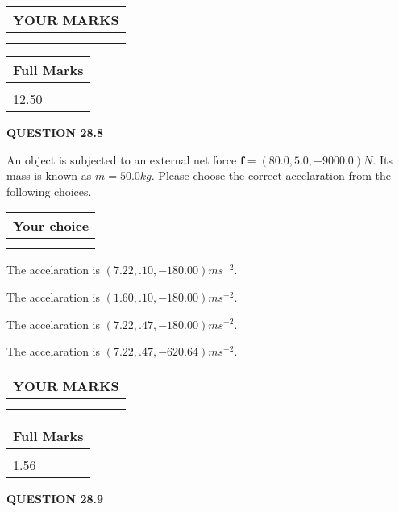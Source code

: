 \documentclass[12pt]{article}
\begin{document}
 

 
\vspace{0.3in}
  
\vspace{0.2in}
  
\noindent\begin{tabular}{|l|}
\hline
 YOUR MARKS  \\
\hline
 \\ 
 \\ 
\hline
\end{tabular}
\hspace{0.05in} \begin{tabular}{|l|}
\hline
 Full Marks  \\
\hline
 \\ 
12.50 \\
\hline
\end{tabular}
{\textbf{\Large{QUESTION
28.8 
}}}
  
  
 
An object is subjected to an external net force $\mathbf{f}=
(80.0 , 5.0 , -9000.0) N$.
Its mass is known as $m= %
50.0 kg$.
Please choose the correct accelaration from the following choices.
  
  
\noindent\hspace{3.0in} \begin{tabular}{|l|}
\hline
Your choice \\
\hline
 \\ 
 \\ 
\hline
\end{tabular}
  
  
 
 
  The accelaration is $  %
(
7.22,
.10,
-180.00)
ms^{-2} $.
 
 
  The accelaration is $  %
(
1.60,
.10,
-180.00)
ms^{-2} $.
 
 
  The accelaration is $  %
(
7.22,
.47,
-180.00)
ms^{-2} $.
 
 
  The accelaration is $  %
(
7.22,
.47,
-620.64)
ms^{-2} $.
 
 
 

 
 
\vspace{0.3in}
  
\vspace{0.2in}
  
\noindent\begin{tabular}{|l|}
\hline
 YOUR MARKS  \\
\hline
 \\ 
 \\ 
\hline
\end{tabular}
\hspace{0.05in} \begin{tabular}{|l|}
\hline
 Full Marks  \\
\hline
 \\ 
1.56 \\
\hline
\end{tabular}
{\textbf{\Large{QUESTION
28.9 
}}}
  
\end{document}
